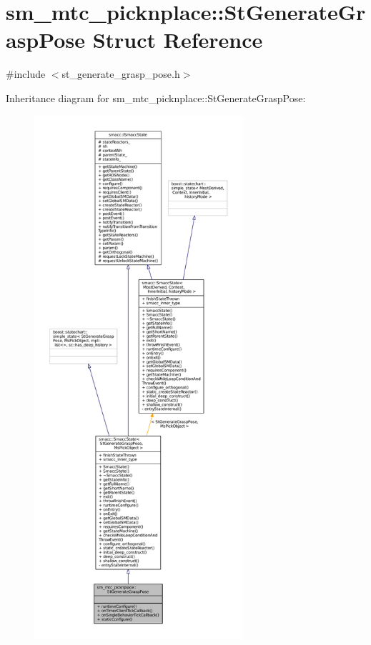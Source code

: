 \hypertarget{structsm__mtc__picknplace_1_1StGenerateGraspPose}{}\section{sm\+\_\+mtc\+\_\+picknplace\+:\+:St\+Generate\+Grasp\+Pose Struct Reference}
\label{structsm__mtc__picknplace_1_1StGenerateGraspPose}


{\ttfamily \#include $<$st\+\_\+generate\+\_\+grasp\+\_\+pose.\+h$>$}



Inheritance diagram for sm\+\_\+mtc\+\_\+picknplace\+:\+:St\+Generate\+Grasp\+Pose\+:
\nopagebreak
\begin{figure}[H]
\begin{center}
\leavevmode
\includegraphics[height=550pt]{structsm__mtc__picknplace_1_1StGenerateGraspPose__inherit__graph}
\end{center}
\end{figure}


